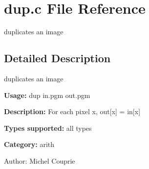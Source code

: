 \section{dup.c File Reference}
\label{dup_8c}
duplicates an image  




\label{_details}
\subsection{Detailed Description}
duplicates an image 

{\bf Usage:} dup in.pgm out.pgm

{\bf Description:} For each pixel x, out[x] = in[x]

{\bf Types supported:} all types

{\bf Category:} arith

\begin{Desc}
\item[Author:]Michel Couprie \end{Desc}

